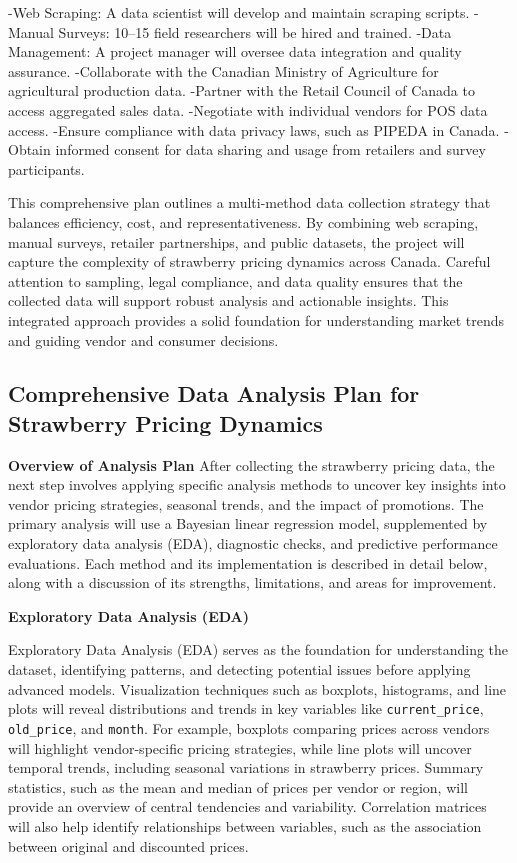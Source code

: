 \documentclass[
  letterpaper,
  DIV=11,
  numbers=noendperiod]{scrartcl}
\begin{document}
-Web Scraping: A data scientist will develop and maintain scraping
scripts. -Manual Surveys: 10--15 field researchers will be hired and
trained. -Data Management: A project manager will oversee data
integration and quality assurance. -Collaborate with the Canadian
Ministry of Agriculture for agricultural production data. -Partner with
the Retail Council of Canada to access aggregated sales data. -Negotiate
with individual vendors for POS data access. -Ensure compliance with
data privacy laws, such as PIPEDA in Canada. -Obtain informed consent
for data sharing and usage from retailers and survey participants.

This comprehensive plan outlines a multi-method data collection strategy
that balances efficiency, cost, and representativeness. By combining web
scraping, manual surveys, retailer partnerships, and public datasets,
the project will capture the complexity of strawberry pricing dynamics
across Canada. Careful attention to sampling, legal compliance, and data
quality ensures that the collected data will support robust analysis and
actionable insights. This integrated approach provides a solid
foundation for understanding market trends and guiding vendor and
consumer decisions.

\subsection{Comprehensive Data Analysis Plan for Strawberry Pricing
Dynamics}\label{comprehensive-data-analysis-plan-for-strawberry-pricing-dynamics}

\textbf{Overview of Analysis Plan} After collecting the strawberry
pricing data, the next step involves applying specific analysis methods
to uncover key insights into vendor pricing strategies, seasonal trends,
and the impact of promotions. The primary analysis will use a Bayesian
linear regression model, supplemented by exploratory data analysis
(EDA), diagnostic checks, and predictive performance evaluations. Each
method and its implementation is described in detail below, along with a
discussion of its strengths, limitations, and areas for improvement.

\textbf{Exploratory Data Analysis (EDA)}

Exploratory Data Analysis (EDA) serves as the foundation for
understanding the dataset, identifying patterns, and detecting potential
issues before applying advanced models. Visualization techniques such as
boxplots, histograms, and line plots will reveal distributions and
trends in key variables like \texttt{current\_price},
\texttt{old\_price}, and \texttt{month}. For example, boxplots comparing
prices across vendors will highlight vendor-specific pricing strategies,
while line plots will uncover temporal trends, including seasonal
variations in strawberry prices. Summary statistics, such as the mean
and median of prices per vendor or region, will provide an overview of
central tendencies and variability. Correlation matrices will also help
identify relationships between variables, such as the association
between original and discounted prices.
\end{document}
